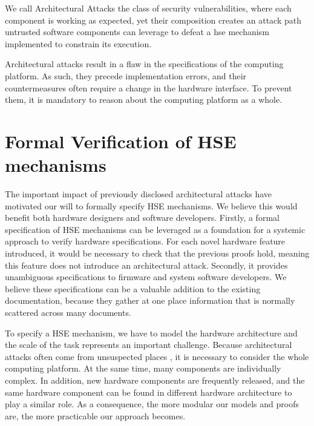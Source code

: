 \begin{definition}
  We call Architectural Attacks the class of security vulnerabilities, where
  each component is working as expected, yet their composition creates an attack
  path untrusted software components can leverage to defeat a \ac{hse} mechanism
  implemented to constrain its execution.
\end{definition}

Architectural attacks result in  a flaw in the specifications of the computing
platform.
%
As such, they precede implementation errors, and their countermeasures often
require a change in the hardware interface.
%
To prevent them, it is mandatory to reason about the computing platform as a
whole.

\section{Formal Verification of HSE mechanisms}
\label{sec:intro:verif}

The important impact of previously disclosed architectural attacks have
motivated our will to formally specify HSE mechanisms.
%
We believe this would benefit both hardware designers and software developers.
%
Firstly, a formal specification of HSE mechanisms can be leveraged as a
foundation for a systemic approach to verify hardware specifications.
%
For each novel hardware feature introduced, it would be necessary to check that
the previous proofs hold, meaning this feature does not introduce an 
architectural attack.
%
Secondly, it provides unambiguous specifications to firmware and system software developers.
%
We believe these specifications can be a valuable addition to the existing
documentation, because they gather at one place information that is normally
scattered across many documents. 

To specify a HSE mechanism, we have to model the hardware architecture and the
scale of the task represents an important challenge.
%
Because architectural attacks often come from unsuspected places , it is
necessary to consider the whole computing platform. At the same time, many
components are individually complex. 
%
In addition, new hardware components are frequently released, and the same
hardware component can be found in different hardware architecture to play a
similar role. 
%
As a consequence, the more modular our models and proofs are, the more
practicable our approach becomes.

